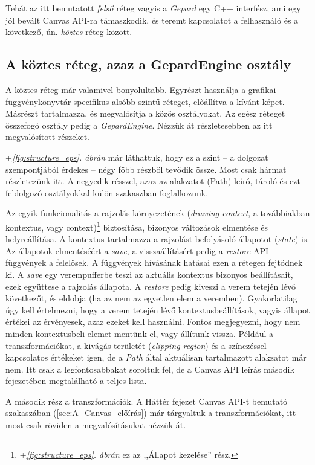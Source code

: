 \documentclass[12pt]{report}
\theoremstyle{definition}
\newcommand{\inenglish}[1]{\textsl{#1}}
\newcommand{\func}[1]{{\textsl{#1}}}
\begin{document}
Tehát az itt bemutatott \emph{felső} réteg vagyis a \func{Gepard} egy C++
interfész, ami egy jól bevált Canvas API-ra támaszkodik, és teremt kapcsolatot
a felhasználó és a következő, ún. \emph{köztes} réteg között.

    \subsection*{A köztes réteg, azaz a GepardEngine osztály}

A köztes réteg már valamivel bonyolultabb. Egyrészt használja a grafikai
függ\-vény\-könyv\-tár-spe\-ci\-fi\-kus alsóbb szintű réteget, előállítva a
kívánt képet. Másrészt tartalmazza, és megvalósítja a közös osztályokat. Az
egész réteget összefogó osztály pedig a \func{GepardEngine}. Nézzük át
részletesebben az itt megvalósított részeket.

\Az+\emph{\ref{fig:structure_eps}. ábrán} már láthattuk, hogy ez a szint -- a
dolgozat szempontjából érdekes -- négy főbb részből tevődik össze. Most csak
hármat részletezünk itt. A negyedik résszel, azaz az alakzatot (Path) leíró,
tároló és ezt feldolgozó osztályokkal külön szakaszban foglalkozunk.

Az egyik funkcionalitás a rajzolás környezetének (\inenglish{drawing context},
a továbbiakban kontextus, vagy
context)\footnote{\Az+\emph{\ref{fig:structure_eps}. ábrán} ez az ,,Állapot
kezelése'' rész.} biztosítása, bizonyos változások elmentése és helyreállítása.
A kontextus tartalmazza a rajzolást befolyásoló állapotot (\inenglish{state})
is. Az állapotok elmentéséért a \func{save}, a visszaállításért pedig a
\func{restore} API-függvények a felelősek. A függvények hívásának hatásai ezen
a rétegen fejtődnek ki. A \func{save} egy verempufferbe teszi az aktuális
kontextus bizonyos beállításait, ezek együttese a rajzolás állapota. A
\func{restore} pedig kiveszi a verem tetején lévő következőt, és eldobja (ha az
nem az egyetlen elem a veremben). Gyakorlatilag úgy kell értelmezni, hogy a
verem tetején lévő kontextusbeállítások, vagyis állapot értékei az érvényesek,
azaz ezeket kell használni. Fontos megjegyezni, hogy nem minden kontextusbeli
elemet mentünk el, vagy állítunk vissza. Például a transzformációkat, a kivágás
területét (\inenglish{clipping region}) és a színezéssel kapcsolatos értékeket
igen, de a \func{Path} által aktuálisan tartalmazott alakzatot már nem. Itt
csak a legfontosabbakat soroltuk fel, de a Canvas API leírás
második fejezetében megtalálható a teljes lista.

A második rész a transzformációk. A Háttér fejezet Canvas API-t bemutató
szakaszában (\ref{sec:A_Canvas_előírás}) már tárgyaltuk a transzformációkat, itt
most csak röviden a megvalósításukat nézzük át.
\end{document}
